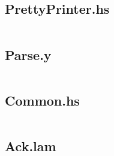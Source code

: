 \documentclass[a4paper,12pt]{article}
\begin{document}
\subsection*{PrettyPrinter.hs}
\inputminted[fontsize=\footnotesize]{haskell}{PrettyPrinter.hs}
\subsection*{Parse.y}
\inputminted[fontsize=\footnotesize]{haskell}{Nparse.y}
\subsection*{Common.hs}
\inputminted[fontsize=\footnotesize]{haskell}{Common.hs}
\subsection*{Ack.lam}
\inputminted[fontsize=\footnotesize]{haskell}{Ack.lam}
%
%
\end{document}

